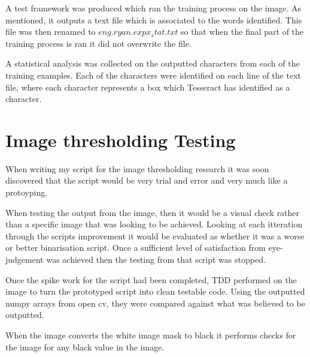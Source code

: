 A test framework was produced which ran the training process on the image. As mentioned, it outputs a text file which is associated to the words identified. This file was then renamed to $eng.ryan.expx_stat.txt$ so that when the final part of the training process is ran it did not overwrite the file.

A statistical analysis was collected on the outputted characters from each of the training examples. Each of the characters were identified on each line of the text file, where each character represents a box which Tesseract has identified as a character.

\section{Image thresholding Testing}
When writing my script for the image thresholding research it was soon discovered that the script would be very trial and error and very much like a protoyping.

When testing the output from the image, then it would be a visual check rather than a specific image that was looking to be achieved. Looking at each itteration through the scripts improvement it would be evaluated as whether it was a worse or better binarisation script. Once a sufficient level of satisfaction from eye-judgement was achieved then the testing from that script was stopped.

Once the spike work for the script had been completed, TDD performed on the image to turn the prototyped script into clean testable code. Using the outputted numpy arrays from open cv, they were compared against what was believed to be outputted.

When the image converts the white image mask to black it performs checks for the image for any black value in the image.
